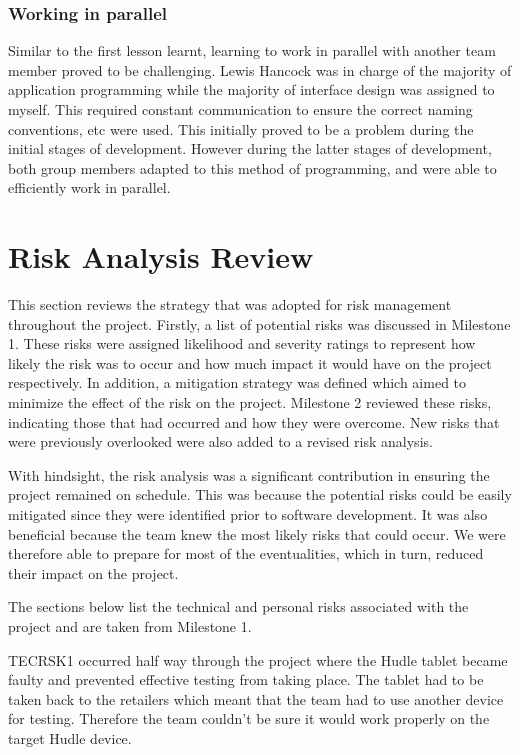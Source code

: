 \documentclass[11pt,a4paper]{report}
\begin{document}
\subsubsection{Working in parallel}
Similar to the first lesson learnt, learning to work in parallel with another team member proved to be challenging. Lewis Hancock was in charge of the majority of application programming while the majority of interface design was assigned to myself. This required constant communication to ensure the correct naming conventions, etc were used. This initially proved to be a problem during the initial stages of development. However during the latter stages of development, both group members adapted to this method of programming, and were able to efficiently work in parallel.

\section{Risk Analysis Review}
\label{sec:risk-analysis-review}
This section reviews the strategy that was adopted for risk management throughout the project. Firstly, a list of potential risks was discussed in Milestone 1. These risks were assigned likelihood and severity ratings to represent how likely the risk was to occur and how much impact it would have on the project respectively. In addition, a mitigation strategy was defined which aimed to minimize the effect of the risk on the project. Milestone 2 reviewed these risks, indicating those that had occurred and how they were overcome. New risks that were previously overlooked were also added to a revised risk analysis.

With hindsight, the risk analysis was a significant contribution in ensuring the project remained on schedule. This was because the potential risks could be easily mitigated since they were identified prior to software development. It was also beneficial because the team knew the most likely risks that could occur. We were therefore able to prepare for most of the eventualities, which in turn, reduced their impact on the project.

The sections below list the technical and personal risks associated with the project and are taken from Milestone 1\cite{milestone1}. 

TECRSK1 occurred half way through the project where the Hudle tablet became faulty and prevented effective testing from taking place. The tablet had to be taken back to the retailers which meant that the team had to use another device for testing. Therefore the team couldn't be sure it would work properly on the target Hudle device.
\end{document}
